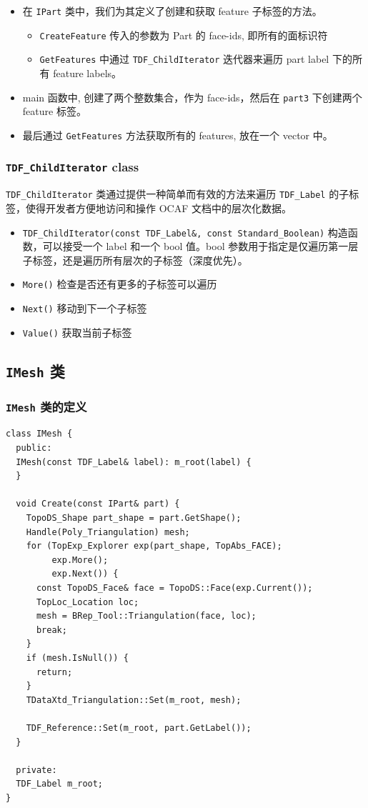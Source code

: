 \documentclass[11pt]{article}
\begin{document}
\begin{itemize}
\item 在 \texttt{IPart} 类中，我们为其定义了创建和获取 feature 子标签的方法。
\begin{itemize}
\item \texttt{CreateFeature} 传入的参数为 Part 的 face-ids, 即所有的面标识符
\item \texttt{GetFeatures} 中通过 \texttt{TDF\_ChildIterator} 迭代器来遍历 part label 下的所有 feature labels。
\end{itemize}
\item main 函数中, 创建了两个整数集合，作为 face-ids，然后在 \texttt{part3} 下创建两个 feature 标签。
\item 最后通过 \texttt{GetFeatures} 方法获取所有的 features, 放在一个 vector 中。
\end{itemize}
\subsubsection{\texttt{TDF\_ChildIterator} class}
\label{sec:org702e493}

\texttt{TDF\_ChildIterator} 类通过提供一种简单而有效的方法来遍历 \texttt{TDF\_Label} 的子标签，使得开发者方便地访问和操作 OCAF 文档中的层次化数据。

\begin{itemize}
\item \texttt{TDF\_ChildIterator(const TDF\_Label\&, const Standard\_Boolean)} 构造函数，可以接受一个 label 和一个 bool 值。bool 参数用于指定是仅遍历第一层子标签，还是遍历所有层次的子标签（深度优先）。
\item \texttt{More()} 检查是否还有更多的子标签可以遍历
\item \texttt{Next()} 移动到下一个子标签
\item \texttt{Value()} 获取当前子标签
\end{itemize}
\subsection{\texttt{IMesh} 类}
\label{sec:org94ec631}

\subsubsection{\texttt{IMesh} 类的定义}
\label{sec:orgc97f9fb}

\begin{verbatim}
class IMesh {
  public:
  IMesh(const TDF_Label& label): m_root(label) {
  }

  void Create(const IPart& part) {
    TopoDS_Shape part_shape = part.GetShape();
    Handle(Poly_Triangulation) mesh;
    for (TopExp_Explorer exp(part_shape, TopAbs_FACE);
         exp.More();
         exp.Next()) {
      const TopoDS_Face& face = TopoDS::Face(exp.Current());
      TopLoc_Location loc;
      mesh = BRep_Tool::Triangulation(face, loc);
      break;
    }
    if (mesh.IsNull()) {
      return;
    }
    TDataXtd_Triangulation::Set(m_root, mesh);

    TDF_Reference::Set(m_root, part.GetLabel());
  }

  private:
  TDF_Label m_root;
}
\end{verbatim}
\end{document}
